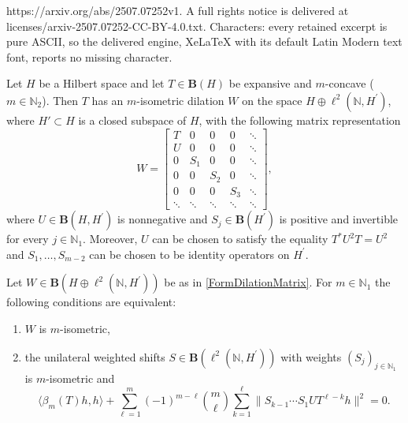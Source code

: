 \documentclass[10pt,a4paper]{amsart}
\begin{document}
https://arxiv.org/abs/2507.07252v1. A full rights notice is delivered at licenses/arxiv-2507.07252-CC-BY-4.0.txt. Characters: every retained excerpt is pure ASCII, so the delivered engine, XeLaTeX with its default Latin Modern text font, reports no missing character.
\begin{theorem}
    \label{ThmDilationOfMConcave}
    Let $ H $ be a Hilbert space and let $ T\in \mathbf{B}(H) $ be expansive and $ m $-concave ($ m\in \mathbb{N}_{2} $). Then $ T $ has an $ m $-isometric dilation $ W $ on the space $ H\oplus \ell^{2}(\mathbb{N}, H^{\prime}) $, where $ H' \subset H $ is a closed subspace of $ H $, with the following matrix representation
    \begin{equation}
        \label{FormDilationMatrix}
        W = \begin{bmatrix}
            T & 0 & 0 & 0 &  \ddots\\
            U & 0 & 0 & 0 &  \ddots\\
            0 & S_{1} & 0 & 0 &  \ddots \\
            0 & 0 & S_{2} & 0 &  \ddots\\
            0 & 0 & 0 & S_{3} &  \ddots\\
            \ddots & \ddots & \ddots & \ddots & \ddots
        \end{bmatrix},
    \end{equation}
    where $ U\in \mathbf{B}(H,H^{\prime}) $ is nonnegative and $ S_{j}\in \mathbf{B}(H^{\prime}) $ is positive and invertible for every $ j\in \mathbb{N}_{1} $. Moreover, $ U $ can be chosen to satisfy the equality $ T^{\ast}U^{2}T = U^{2} $ and $ S_{1},\ldots,S_{m-2} $ can be chosen to be identity operators on $ H^{\prime} $.
\end{theorem}

\begin{lemma}
    \label{LemMIsometricityOfDilation}
    Let $ W\in \mathbf{B}(H\oplus\ell^{2}(\mathbb{N},H^{\prime})) $ be as in \eqref{FormDilationMatrix}. For $ m \in \mathbb{N}_{1} $ the following conditions are equivalent:
    \begin{enumerate}
        \item $ W $ is $ m $-isometric,
        \item the unilateral weighted shifts $ S\in \mathbf{B}(\ell^{2}(\mathbb{N},H^{\prime})) $ with weights $ (S_{j})_{j\in \mathbb{N}_{1}} $ is $ m $-isometric and
        \begin{equation}
            \label{FormDilationMatrixMIsometric}
            \langle \beta_{m}(T)h,h\rangle +\sum_{\ell=1}^{m}(-1)^{m-\ell}\binom{m}{\ell}\sum_{k=1}^{\ell} \lVert S_{k-1}\cdots S_{1}UT^{\ell-k}h\rVert^{2} = 0.
        \end{equation}
    \end{enumerate}
\end{lemma}
\end{document}
